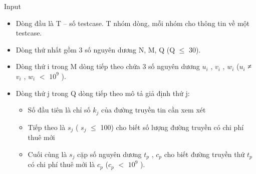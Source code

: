 Input
\begin{itemize}
	\item Dòng đầu là T – số testcase. T nhóm dòng, mỗi nhóm cho thông tin về một testcase.
	\item Dòng thứ nhất gồm 3 số nguyên dương N, M, Q (Q  $\le$  30).
	\item Dòng thứ i trong M dòng tiếp theo chứa 3 số nguyên dương $u_{i}$ , $v_{i}$ , $w_{i}$ ($u_{i}$ ≠ $v_{i}$ , $w_{i}$ $<$ $10^{9}$ ).
	\item Dòng thứ j trong Q dòng tiếp theo mô tả giả định thứ j:
\begin{itemize}
	\item Số đầu tiên là chỉ số $k_{j}$ của đường truyền tin cần xem xét
	\item Tiếp theo là $s_{j}$ ( $s_{j}$  $\le$  100) cho biết số lượng đường truyền có chi phí thuê mới
	\item Cuối cùng là $s_{j}$ cặp số nguyên dương $t_{p}$ , $c_{p}$ cho biết đường truyền thứ $t_{p}$ có chi phí thuê mới là $c_{p}$ ($c_{p}$ $<$ $10^{9}$ ).
\end{itemize}
\end{itemize}